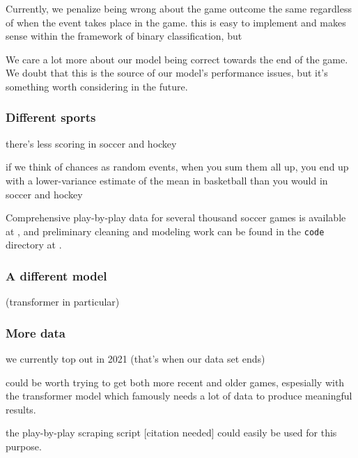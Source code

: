 Currently, we penalize being wrong about the game outcome the same regardless of when the event takes place in the game. this is easy to implement and makes sense within the framework of binary classification, but

We care a lot more about our model being correct towards the end of the game. We doubt that this is the source of our model's performance issues, but it's something worth considering in the future.

\subsubsection{Different sports}

there's less scoring in soccer and hockey

if we think of chances as random events, when you sum them all up, you end up with a lower-variance estimate of the mean in basketball than you would in soccer and hockey

Comprehensive play-by-play data for several thousand soccer games is available at \cite{statsbomb-open-data}, and preliminary cleaning and modeling work can be found in the \texttt{code} directory at \cite{stat-comps-github}.

\subsubsection{A different model}

(transformer in particular)

\subsubsection{More data}

we currently top out in 2021 (that's when our data set ends)

could be worth trying to get both more recent and older games, espesially with the transformer model which famously needs a lot of data to produce meaningful results.

the play-by-play scraping script [citation needed] could easily be used for this purpose.

